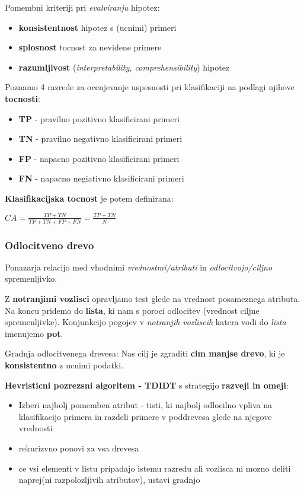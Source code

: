 \documentclass{article}
\begin{document}
\begin{multicols}{2}
Pomembni kriteriji pri \textit{evalviranju} hipotez:
\begin{itemize}
  \item \textbf{konsistentnost} hipotez s (ucnimi) primeri
  \item \textbf{splosnost} tocnost za nevidene primere 
  \item \textbf{razumljivost} (\textit{interpretability, comprehensibility}) hipotez
\end{itemize}

Poznamo 4 razrede za ocenjevanje uspesnosti pri klasifikaciji na podlagi njihove \textbf{tocnosti}:
\begin{itemize}
  \item \textbf{TP} - pravilno pozitivno klasificirani primeri
  \item \textbf{TN} - pravilno negativno klasificirani primeri 
  \item \textbf{FP} - napacno pozitivno klasificirani primeri
  \item \textbf{FN} - napacno negiativno klasificirani primeri
\end{itemize}

\textbf{Klasifikacijska tocnost} je potem definirana:

\begin{center}
  \begin{math}
    CA = \frac{TP + TN}{TP + TN + FP + FN} = \frac{TP + TN}{N}
  \end{math}
\end{center}

\subsubsection{Odlocitveno drevo}
Ponazarja relacijo med vhodnimi \textit{vrednostmi/atributi} in \textit{odlocitvojo/ciljno} spremenljivko.

Z \textbf{notranjimi vozlisci} opravljamo test glede na vrednost posameznega atributa. Na koncu pridemo do \textbf{lista}, ki nam
s poroci odlocitev (vrednost ciljne spremenljivke). Konjunkcijo pogojev v \textit{notranjih vozliscih} katera vodi do \textit{lista}
imenujemo \textbf{pot}.

Gradnja odlocitvenega drevesa:
Nas cilj je zgraditi \textbf{cim manjse drevo}, ki je \textbf{konsistentno} z ucnimi podatki.

\textbf{Hevristicni pozrezsni algoritem - TDIDT} s strategijo \textbf{razveji in omeji}:
\begin{itemize}
  \item Izberi najbolj pomemben atribut - tisti, ki najbolj odlocilno vpliva na klasifikacijo primera in razdeli
    primere v poddrevesa glede na njegove vrednosti
  \item  rekurizvno ponovi za vsa drevesa
  \item ce vsi elementi v listu pripadajo istemu razredu ali vozlisca ni mozno deliti naprej(ni razpolozljivih atributov), ustavi gradnjo
\end{itemize}


\end{multicols}
\end{document}
